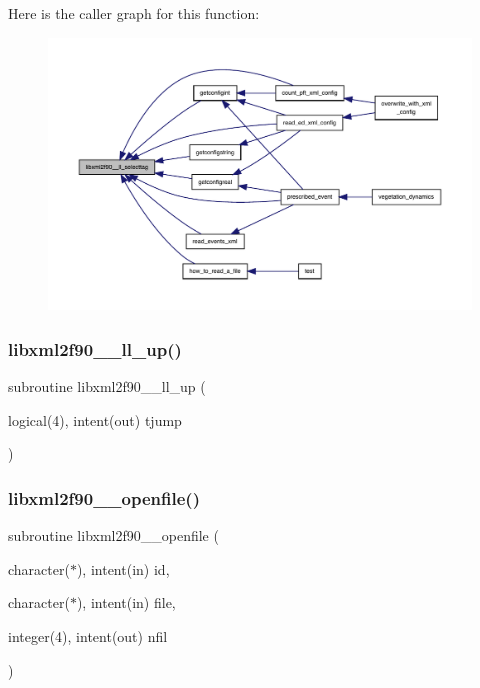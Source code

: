 Here is the caller graph for this function\+:
\nopagebreak
\begin{figure}[H]
\begin{center}
\leavevmode
\includegraphics[width=350pt]{libxml2f90_8f90__pp_8f90_a82a4ef1569ea46506f400cf73fce7369_icgraph}
\end{center}
\end{figure}
\mbox{\label{libxml2f90_8f90__pp_8f90_a4fdb16cf1b5c9a1b391a00dc270c835f}} 
\subsubsection{\texorpdfstring{libxml2f90\+\_\+\+\_\+ll\+\_\+up()}{libxml2f90\_\_ll\_up()}}
{\footnotesize\ttfamily subroutine libxml2f90\+\_\+\+\_\+ll\+\_\+up (\begin{DoxyParamCaption}\item[{logical(4), intent(out)}]{tjump }\end{DoxyParamCaption})}

\mbox{\label{libxml2f90_8f90__pp_8f90_afd27bcb20bad3d7a8445a9090dcd8d01}} 
\subsubsection{\texorpdfstring{libxml2f90\+\_\+\+\_\+openfile()}{libxml2f90\_\_openfile()}}
{\footnotesize\ttfamily subroutine libxml2f90\+\_\+\+\_\+openfile (\begin{DoxyParamCaption}\item[{character($\ast$), intent(in)}]{id,  }\item[{character($\ast$), intent(in)}]{file,  }\item[{integer(4), intent(out)}]{nfil }\end{DoxyParamCaption})}

